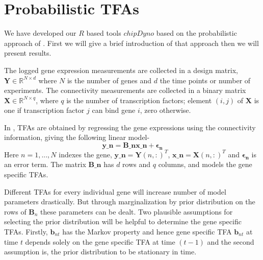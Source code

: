 

\section{Probabilistic TFAs}
We have developed our $R$ based tools $chipDyno$ based on the probabilistic approach of \cite{Sanguinetti:2006}. First we will give a brief introduction of that approach then we will present results.

The logged gene expression measurements are collected in a design matrix, $\textbf{Y} \in \mathbb{R}^{ N \times d}$ where $N$ is the number of genes and $d$ the time points or number of experiments. 
The connectivity measurements are collected in a binary matrix $\textbf{X} \in \mathbb{R} ^ {N \times q}$, where $q$ is the number of transcription factors; element $(i, j)$ of $\textbf{X}$ is one 
if transcription factor $j$ can bind gene $i$, zero otherwise.

In \cite{Sanguinetti:2006}, TFAs are obtained by regressing the gene expressions using the connectivity information, giving the following linear model- 
\begin{equation} \label{eq:linear_model_TFA}
\textbf{y_{n}} = \textbf{B_{n}} \textbf{x_{n}} + \boldsymbol{\epsilon_{n}}
\end{equation}
Here $n = 1, . . . ,N$ indexes the gene, $\textbf{y_{n}}=\textbf{Y}(n,:)^T $, $\textbf{x_{n}}=\textbf{X}(n,:)^T$ and $\boldsymbol{\epsilon_{n}}$ is an error term. The matrix $\textbf{B_{n}}$ has $d$ rows and $q$ columns, and models the gene specific TFAs.

Different TFAs for every individual gene will increase number of model parameters drastically. But through marginalization by prior distribution on the rows of $\textbf{B}_n$ these parameters can be dealt. Two plausible assumptions for selecting the prior distribution will be helpful to determine the gene specific TFAs. Firstly, $\textbf{b}_{nt}$ has the Markov property and hence gene specific TFA $\textbf{b}_{nt} $ at time $t$ depends solely on the gene specific TFA at time $(t-1)$ and the second assumption is, the prior distribution to be stationary in time.

